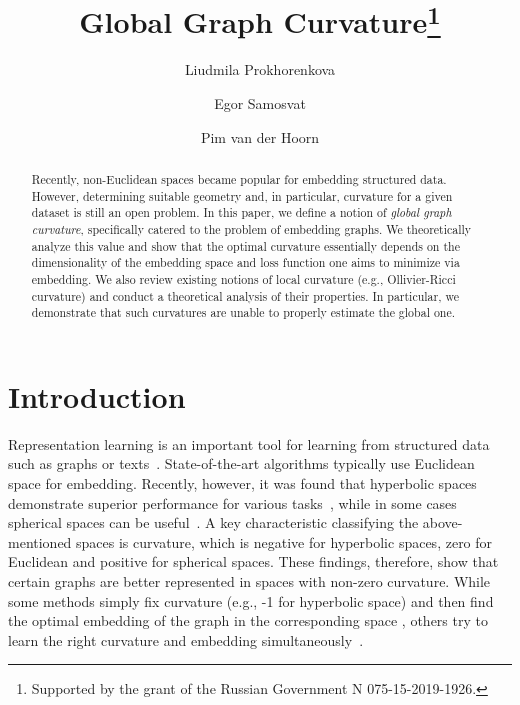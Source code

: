 \documentclass[runningheads]{llncs}
\begin{document}
%
\title{Global Graph Curvature\thanks{Supported by the grant of the Russian Government N 075-15-2019-1926.}}
%
%
\author{Liudmila Prokhorenkova \and
Egor Samosvat \and
Pim van der Hoorn}
%
%
%
\maketitle              %
%
\begin{abstract}
Recently, non-Euclidean spaces became popular for embedding structured data. However, determining suitable geometry and, in particular, curvature for a given dataset is still an open problem. 
In this paper, we define a notion of \textit{global graph curvature}, specifically catered to the problem of embedding graphs.
We theoretically analyze this value and show that the optimal curvature essentially depends on the dimensionality of the embedding space and loss function one aims to minimize via embedding. 
We also review existing notions of local curvature (e.g., Ollivier-Ricci curvature) and conduct a theoretical analysis of their properties. 
In particular, we demonstrate that such curvatures are unable to properly estimate the global one. 

\end{abstract}
%
%
%

\section{Introduction}

Representation learning is an important tool for learning from structured data such as graphs or texts~\cite{grover2016node2vec,mikolov2013distributed,perozzi2014deepwalk}.
State-of-the-art algorithms typically use Euclidean space for embedding. 
Recently, however, it was found that hyperbolic spaces demonstrate superior performance for various tasks~\cite{nickel2018learning,sala2018representation}, while in some cases spherical spaces can be useful~\cite{liu2017sphereface}. A key characteristic classifying the above-mentioned spaces is curvature, which is negative for hyperbolic spaces, zero for Euclidean and positive for spherical spaces. These findings, therefore, show that certain graphs are better represented in spaces with non-zero curvature. While some methods simply fix curvature (e.g., -1 for hyperbolic space) and then find the optimal embedding of the graph in the corresponding space \cite{nickel2018learning}, others try to learn the right curvature and embedding simultaneously~\cite{gu2019learning}.
\end{document}

